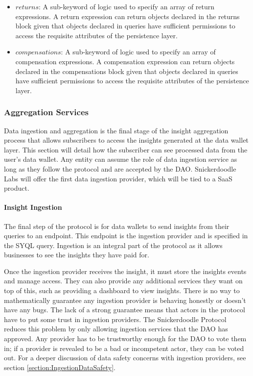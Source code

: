 \begin{itemize}
    \item $returns$: A sub-keyword of logic used to specify an array of return expressions. A return expression can return objects declared in the returns block given that objects declared in queries have sufficient permissions to access the requisite attributes of the persistence layer.
    \item $compensations$: A sub-keyword of logic used to specify an array of compensation expressions. A compensation expression can return objects declared in the compensations block given that objects declared in queries have sufficient permissions to access the requisite attributes of the persistence layer.
\end{itemize}

\subsubsection{Aggregation Services} %

Data ingestion and aggregation is the final stage of the insight aggregation process that allows subscribers to access the insights generated at the data wallet layer. 
This section will detail how the subscriber can see processed data from the user's data wallet. Any entity can assume the role of data ingestion service 
as long as they follow the protocol and are accepted by the DAO. Snickerdoodle Labs will offer the first data ingestion provider, which will be tied to 
a SaaS product. 

\paragraph{Insight Ingestion}
The final step of the protocol is for data wallets to send insights from their queries to an endpoint. This endpoint is the ingestion provider and is 
specified in the SYQL query. Ingestion is an integral part of the protocol as it allows businesses to see the insights they have paid for.

Once the ingestion provider receives the insight, it must store the insights events and manage access. They can also provide any additional services 
they want on top of this, such as providing a dashboard to view insights. There is no way to mathematically guarantee any ingestion provider is behaving 
honestly or doesn't have any bugs. The lack of a strong guarantee means that actors in the protocol have to put some trust in ingestion providers. The 
Snickerdoodle Protocol reduces this problem by only allowing ingestion services that the DAO has approved. Any provider has to be trustworthy enough for 
the DAO to vote them in; if a provider is revealed to be a bad or incompetent actor, they can be voted out. For a deeper discussion of data safety 
concerns with ingestion providers, see section \ref{section:IngestionDataSafety}.

